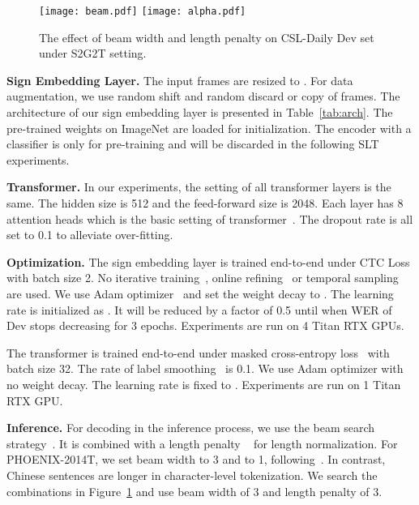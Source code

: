 \documentclass[final]{cvpr}
\begin{document}
\begin{figure}[tp]
   \centering
   \texttt{[image: beam.pdf]}
   \texttt{[image: alpha.pdf]}
   \caption{The effect of beam width and length penalty  on CSL-Daily Dev set under S2G2T setting.}\label{fig:alphabeam}
\vspace{-8pt}
\end{figure}



\textbf{Sign Embedding Layer.} 
The input frames are resized to . 
For data augmentation, we use random shift and random discard or copy of  frames. 
The architecture of our sign embedding layer is presented in Table~\ref{tab:arch}. 
The pre-trained weights on ImageNet are loaded for initialization. 
The encoder with a classifier is only for pre-training and will be discarded in the following SLT experiments.    

\textbf{Transformer.}
In our experiments, the setting of all transformer layers is the same. 
The hidden size is 512 and the feed-forward size is 2048. 
Each layer has 8 attention heads which is the basic setting of transformer~\cite{vaswani2017attention}. 
The dropout rate is all set to 0.1 to alleviate over-fitting. 

\textbf{Optimization.}
The sign embedding layer is trained end-to-end under CTC Loss with batch size 2. 
No iterative training~\cite{DPD_icme19}, online refining~\cite{cslr-fcn-20fully} or temporal sampling~\cite{cslr-20-Stochastic} are used. 
We use Adam optimizer~\cite{adam} and set the weight decay to . 
The learning rate is initialized as . 
It will be reduced by a factor of 0.5 until  when WER of Dev stops decreasing for 3 epochs. 
Experiments are run on 4 Titan RTX GPUs. 

The transformer is trained end-to-end under masked cross-entropy loss~\cite{trans-vaswani17attention} with batch size 32. 
The rate of label smoothing~\cite{labelsmooth,trans-vaswani17attention} is 0.1.  
We use Adam optimizer with no weight decay. 
The learning rate is fixed to . 
Experiments are run on 1 Titan RTX GPU. 

\textbf{Inference.} 
For decoding in the inference process, we use the beam search strategy~\cite{googletranslation}. It is combined with a length penalty ~\cite{googletranslation} for length normalization. 
For PHOENIX-2014T, we set beam width to 3 and  to 1, following~\cite{slt-trans-cihan20}. 
In contrast, Chinese sentences are longer in character-level tokenization. 
We search the combinations in Figure~\ref{fig:alphabeam} and use beam width of 3 and length penalty  of 3. 
\end{document}
